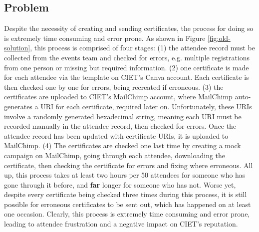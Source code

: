 \documentclass[11pt]{article}
\begin{document}
\subsection{Problem}

Despite the necessity of creating and sending certificates, the process for doing so is extremely time consuming and error prone. As shown in Figure \ref{fig:old-solution}, this process is comprised of four stages: (1) the attendee record must be collected from the events team and checked for errors, e.g. multiple registrations from one person or missing but required information. (2) one certificate is made for each attendee via the template on CIET's Canva account. Each certificate is then checked one by one for errors, being recreated if erroneous. (3) the certificates are uploaded to CIET's MailChimp account, where MailChimp auto-generates a URI for each certificate, required later on. Unfortunately, these URIs involve a randomly generated hexadecimal string, meaning each URI must be recorded manually in the attendee record, then checked for errors. Once the attendee record has been updated with certificate URIs, it is uploaded to MailChimp. (4) The certificates are checked one last time by creating a mock campaign on MailChimp, going through each attendee, downloading the certificate, then checking the certificate for errors and fixing where erroneous. All up, this process takes at least two hours per 50 attendees for someone who has gone through it before, and \textbf{far} longer for someone who has not. Worse yet, despite every certificate being checked three times during this process, it is still possible for erroneous certificates to be sent out, which has happened on at least one occasion. Clearly, this process is extremely time consuming and error prone, leading to attendee frustration and a negative impact on CIET's reputation.

\newpage
\end{document}
